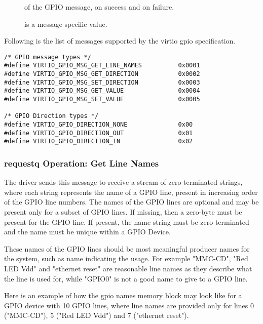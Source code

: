 \begin{description}
\item[] of the GPIO message,
     on success and 
    on failure.

\item[] is a message specific value.
\end{description}

Following is the list of messages supported by the virtio gpio specification.

\begin{lstlisting}
/* GPIO message types */
#define VIRTIO_GPIO_MSG_GET_LINE_NAMES          0x0001
#define VIRTIO_GPIO_MSG_GET_DIRECTION           0x0002
#define VIRTIO_GPIO_MSG_SET_DIRECTION           0x0003
#define VIRTIO_GPIO_MSG_GET_VALUE               0x0004
#define VIRTIO_GPIO_MSG_SET_VALUE               0x0005

/* GPIO Direction types */
#define VIRTIO_GPIO_DIRECTION_NONE              0x00
#define VIRTIO_GPIO_DIRECTION_OUT               0x01
#define VIRTIO_GPIO_DIRECTION_IN                0x02
\end{lstlisting}

\subsubsection{requestq Operation: Get Line Names}\label{sec:Device Types / GPIO Device / requestq Operation / Get Line Names}

The driver sends this message to receive a stream of zero-terminated strings,
where each string represents the name of a GPIO line, present in increasing
order of the GPIO line numbers. The names of the GPIO lines are optional and may
be present only for a subset of GPIO lines. If missing, then a zero-byte must be
present for the GPIO line. If present, the name string must be zero-terminated
and the name must be unique within a GPIO Device.

These names of the GPIO lines should be most meaningful producer names for the
system, such as name indicating the usage. For example "MMC-CD", "Red LED Vdd"
and "ethernet reset" are reasonable line names as they describe what the line is
used for, while "GPIO0" is not a good name to give to a GPIO line.

Here is an example of how the gpio names memory block may look like for a GPIO
device with 10 GPIO lines, where line names are provided only for lines 0
("MMC-CD"), 5 ("Red LED Vdd") and 7 ("ethernet reset").

